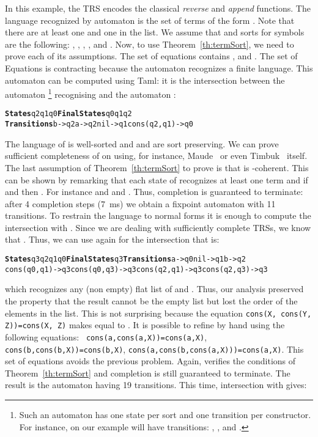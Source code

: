 \documentclass[a4paper,11pt]{llncs}
\newcommand{\timbuk}{{\sf Timbuk}}
\def\timFont{\bf}
\newcommand{\States}{{\timFont States}}
\newcommand{\FinalStates}{{\timFont Final States}}
\newcommand{\Transitions}{{\timFont Transitions}}
\theoremstyle{plain}
\begin{document}
\noindent
In this example, the TRS  encodes the classical {\em reverse} and {\em
  append} functions. The language recognized by automaton  is the set of
terms of the form  . Note that there are at
least one  and one  in the list. We assume that  and
sorts for symbols are the following: , , , ,  and . Now, to use Theorem~\ref{th:termSort}, we need to prove each of
its assumptions.  The set  of equations contains ,  and
. The set of Equations  is contracting because the automaton
 recognizes a finite language. This automaton can be computed
using Taml: it is the intersection between the automaton
\footnote{Such an automaton has one
  state per sort and one transition per constructor. For instance, on our
  example  will have transitions: , ,
   and .}  recognising  and the
automaton :

{\footnotesize
\begin{alltt}
\States q2 q1 q0 \FinalStates q0 q1 q2 
\Transitions b->q2 a->q2 nil->q1 cons(q2,q1)->q0
\end{alltt}
}

\noindent
The language of  is well-sorted and  and  are sort preserving.  We can
prove sufficient completeness of  on  using, for instance,
Maude~\cite{maude-manual} or even \timbuk~\cite{Genet-RTA98} itself. 
The last
assumption of Theorem~\ref{th:termSort} to prove is that  is
-coherent. This can be shown by remarking that each state  of 
recognizes at least one term and if  and  then . For instance  and  and . Thus, completion is guaranteed to terminate:
after 4 completion steps (7~ms) we obtain a fixpoint automaton 
with 11 transitions. To restrain the language to normal forms it is
enough to compute the intersection with .
Since we are dealing with sufficiently complete TRSs, we know that
. Thus, we can use again  for the
intersection that is:
 
{\footnotesize
\begin{alltt}
\States q3 q2 q1 q0  \FinalStates q3  \Transitions a->q0  nil->q1  b->q2  
cons(q0,q1)->q3  cons(q0,q3)->q3  cons(q2,q1)->q3  cons(q2,q3)->q3
\end{alltt}
}
 
\noindent
which recognizes any (non empty) flat list of  and . Thus, our analysis  preserved
the property that the result cannot be the empty list but lost the order of the
elements in the list. This is not surprising because
the equation {\tt \footnotesize cons(X, cons(Y, Z))=cons(X, Z)}
makes  equal to . It is possible to refine
by hand  using the following equations: {\tt \footnotesize
  cons(a,cons(a,X))=cons(a,X)}, {\tt \footnotesize cons(b,cons(b,X))=cons(b,X)},
  {\tt \footnotesize cons(a,cons(b,cons(a,X)))=cons(a,X)}.
This set of equations avoids the previous problem. Again, 
 verifies the conditions of Theorem~\ref{th:termSort} and completion is
still guaranteed to terminate. The result is the automaton  having 19
transitions. This time, intersection with  gives:
 
\end{document}
